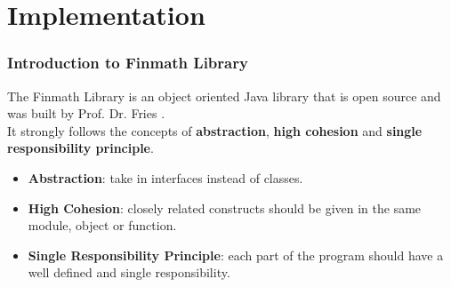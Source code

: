 \documentclass{beamer}
\begin{document}
	\section{Implementation}\label{Implementation}
	
	\begin{frame}
		\frametitle{}
		\tableofcontents[ 
		currentsection, 
		sectionstyle=show/shaded, 
		subsectionstyle=show/shaded, 
		] 
	\end{frame}
	
	\begin{frame}
		\frametitle{Introduction to Finmath Library}
		
		The Finmath Library is an object oriented Java library that is open source and was built by Prof. Dr. Fries \cite{finmathWebsite}.\\
		It strongly follows the concepts of \textbf{abstraction}, \textbf{high cohesion} and \textbf{single responsibility principle}.
		\begin{itemize}
			\item \textbf{Abstraction}: take in interfaces instead of classes.
			\item \textbf{High Cohesion}: closely related constructs should be given in the same module, object or function.
			\item \textbf{Single Responsibility Principle}: each part of the program should have a well defined and single responsibility.
		\end{itemize}
		
	\end{frame}
	
\end{document}
